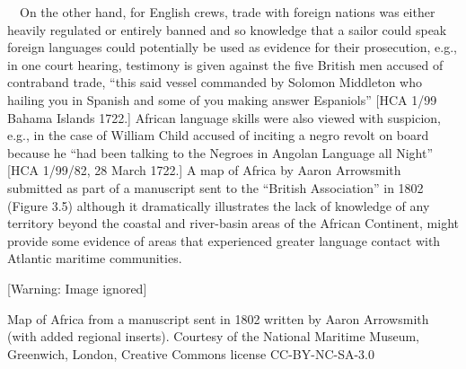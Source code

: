 \begin{styleStandard}
\ \ On the other hand, for English crews, trade with foreign nations was either heavily regulated or entirely banned and so knowledge that a sailor could speak foreign languages could potentially be used as evidence for their prosecution, e.g., in one court hearing, testimony is given against the five British men accused of contraband trade, “this said vessel commanded by Solomon Middleton who hailing you in Spanish and some of you making answer Espaniols” [HCA 1/99 Bahama Islands 1722.] African language skills were also viewed with suspicion, e.g., in the case of William Child accused of inciting a negro revolt on board because he “had been talking to the Negroes in Angolan Language all Night” [HCA 1/99/82, 28 March 1722.] A map of Africa by Aaron Arrowsmith submitted as part of a manuscript sent to the “British Association” in 1802 (Figure 3.5) although it dramatically illustrates the lack of knowledge of any territory beyond the coastal and river-basin areas of the African Continent, might provide some evidence of areas that experienced greater language contact with Atlantic maritime communities. 
\end{styleStandard}

\begin{styleStandard}

\end{styleStandard}

\begin{center}
 [Warning: Image ignored] %

\end{center}
\begin{styleStandard}
Map of Africa from a manuscript sent in 1802 written by Aaron Arrowsmith (with added regional inserts). Courtesy of the National Maritime Museum, Greenwich, London, Creative Commons license CC-BY-NC-SA-3.0
\end{styleStandard}

